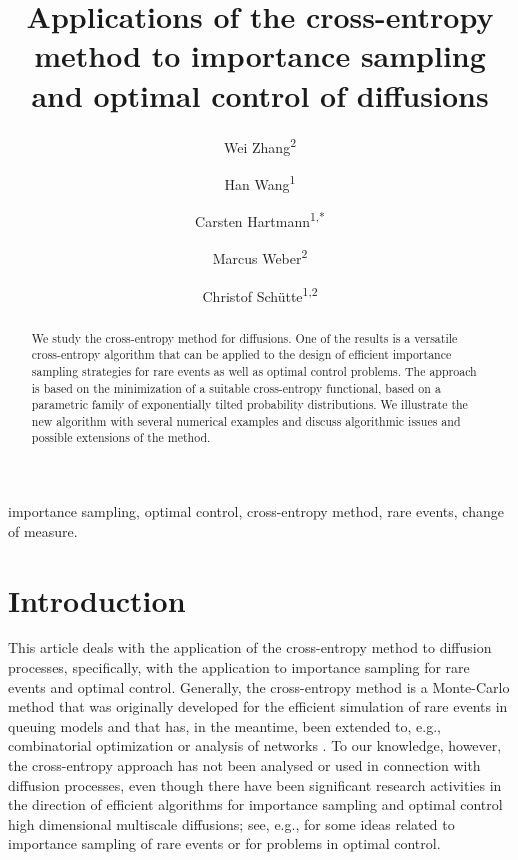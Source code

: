 \documentclass[final]{siamltex}
\begin{document}
\title{Applications of the cross-entropy method to importance sampling and optimal control of diffusions}
\author{Wei Zhang\textsuperscript{2}\and Han Wang\textsuperscript{1} \and
  Carsten Hartmann\textsuperscript{1,*}\and 
Marcus Weber\textsuperscript{2}\and Christof Sch\"{u}tte\textsuperscript{1,2}}
\renewcommand{\thefootnote}{\fnsymbol{footnote}}
\date{}
\maketitle
\begin{abstract}
 We study the cross-entropy method for diffusions. One of the results is a
  versatile cross-entropy algorithm that can be applied to the design of efficient importance sampling strategies for rare events as well as optimal
  control problems. The approach is based on the minimization of a suitable cross-entropy functional, based on a parametric family of exponentially tilted probability distributions. We illustrate the new algorithm with several numerical examples and discuss algorithmic issues and possible extensions of the method.
\end{abstract}
\begin{keywords}
importance sampling, optimal control, cross-entropy method, rare events, change of measure. 
\end{keywords}
\begin{AMS}
\end{AMS}

\section{Introduction}
\label{intro}
This article deals with the application of the cross-entropy method to diffusion processes, specifically, with the application to  
importance sampling for rare events and optimal control. Generally, the cross-entropy method is a Monte-Carlo method that was originally developed for the efficient simulation of rare events in queuing models and that has, in the meantime, been extended to, e.g., combinatorial optimization or analysis of networks \cite{ce_book,ce_tutorial}. To our knowledge, however, the cross-entropy approach has not been analysed or used in connection with diffusion processes, even though there have been significant research activities in the direction of efficient algorithms for importance sampling and optimal control high dimensional multiscale diffusions; see, e.g., \cite{ip-dupuis-multiscale, ip-eric,
zhws13} for some ideas related to importance sampling of rare events or \cite{control_schuette, zlph2013} for problems in 
optimal control. 
\end{document}

